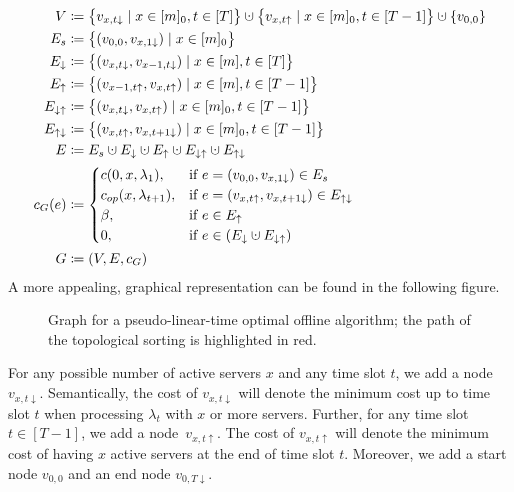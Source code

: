 \begin{align*}
	V&\coloneqq\bigl\{v_{x,t\downarrow}\mid x\in[m]_0,t\in[T]\bigr\}\dotcup\bigl\{v_{x,t\uparrow}\mid x\in[m]_0,t\in[T-1]\bigr\}\dotcup\{v_{0,0}\}\\
	E_s&\coloneqq\bigl\{(v_{0,0},v_{x,1\downarrow})\mid x\in[m]_0\bigr\}\\
	E_\downarrow&\coloneqq\bigl\{(v_{x,t\downarrow},v_{x-1,t\downarrow})\mid x\in[m],t\in[T]\bigr\}\\
	E_\uparrow&\coloneqq\bigl\{(v_{x-1,t\uparrow},v_{x,t\uparrow})\mid x\in[m],t\in[T-1]\bigr\}\\
	E_{\downarrow\uparrow}&\coloneqq\bigl\{(v_{x,t\downarrow},v_{x,t\uparrow})\mid x\in[m]_0,t\in[T-1]\bigr\}\\
	E_{\uparrow\downarrow}&\coloneqq\bigl\{(v_{x,t\uparrow},v_{x,t+1\downarrow})\mid x\in[m]_0,t\in[T-1]\bigr\}\\
	E&\coloneqq E_s\dotcup E_\downarrow\dotcup E_\uparrow\dotcup E_{\downarrow\uparrow}\dotcup E_{\uparrow\downarrow}\\
	c_G(e)&\coloneqq
	\begin{cases}
		\costs(0,x,\lambda_1), & \text{if $e=(v_{0,0},v_{x,1\downarrow})\in E_s$}\\
		\opcosts(x,\lambda_{t+1}), & \text{if $e=(v_{x,t\uparrow},v_{x,t+1\downarrow})\in E_{\uparrow\downarrow}$}\\
		\beta, & \text{if $e\in E_\uparrow$}\\
		0, & \text{if $e\in(E_\downarrow\dotcup E_{\downarrow\uparrow})$}
	\end{cases}\\
	G&\coloneqq(V,E,c_G)
\end{align*}
A more appealing, graphical representation can be found in the following figure.
\begin{figure}[H]

\caption{Graph for a pseudo-linear-time optimal offline algorithm; the path of the topological sorting is highlighted in red.}
\label{fig:graph_pseudo_lin}
\end{figure}
For any possible number of active servers $x$ and any time slot $t$, we add a node~$v_{x,t\downarrow}$. Semantically, the cost of $v_{x,t\downarrow}$ will denote the minimum cost up to time slot $t$ when processing $\lambda_t$ with $x$ or more servers. Further, for any time slot $t\in[T-1]$, we add a node~$v_{x,t\uparrow}$. The cost of $v_{x,t\uparrow}$ will denote the minimum cost of having $x$ active servers at the end of time slot $t$. Moreover, we add a start node $v_{0,0}$ and an end node $v_{0,T\downarrow}$.

